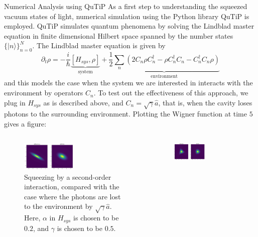 \documentclass[final]{beamer}
\newcommand*\ket[1]{|{#1}\rangle}
\newlength{\colwidth}
\begin{document}
\begin{frame}[t]
\begin{columns}[t]
    \begin{column}{\colwidth}
      \begin{block}{Numerical Analysis using QuTiP}
        As a first step to understanding the squeezed vacuum states of light, numerical simulation using the Python library QuTiP is employed.
        QuTiP simulates quantum phenomena by solving the Lindblad master equation in finite dimensional Hilbert space spanned by the number states $\{\ket{n}\}_{n=0}^{N}$.
        The Lindblad master equation is given by
        \[\partial_{t}\rho=-\frac{i}{\hbar}\underbrace{[H_{sys},\rho]}_{\text{system}}+\underbrace{\frac{1}{2}\sum_{n}(2C_{n}\rho C_{n}^{\dag}-\rho C_{n}^{\dag}C_{n}-C_{n}^{\dag} C_{n}\rho)}_{\text{environment}}\]
        and this models the case when the system we are interested in interacts with the environment by operators $C_{n}$.
        To test out the effectiveness of this approach, we plug in $H_{sys}$ as is described above, and $C_{n}=\sqrt{\gamma}\hat{a}$, that is, when the cavity loses photons to the surrounding environment.
        Plotting the Wigner function at time $5$ gives a figure:
        \begin{columns}
          \begin{column}{0.5\textwidth}
            \begin{figure}
              \includegraphics[width=0.5\textwidth]{squeezed_decay_0.5.png}
              \caption{Squeezing by a second-order interaction, compared with the case where the photons are lost to the environment by $\sqrt{\gamma}\hat{a}$. Here, $\alpha$ in $H_{sys}$ is chosen to be $0.2$, and $\gamma$ is chosen to be $0.5$.}
            \end{figure}
          \end{column}
          \begin{column}{0.5\textwidth}
            \begin{figure}
              \includegraphics[width=0.5\textwidth]{third_decay_0.5.png}

\end{figure}
\end{column}
\end{columns}
\end{block}
\end{column}
\end{columns}
\end{frame}
\end{document}
